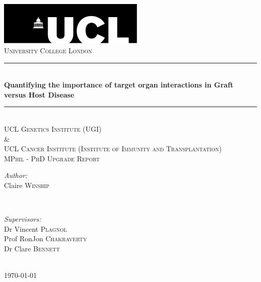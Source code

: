 \documentclass[a4paper,11pt]{report}
\begin{document}
\begin{titlepage}%
\newcommand{\HRule}{\rule{\linewidth}{0.5mm}}

\center 

\includegraphics[width=7cm]{Figures/ucllogo.jpg}\\[1cm]
\textsc{\LARGE University College London}\\[2cm] %
\HRule \\[1cm]
{ \huge \bfseries Quantifying the importance of target organ interactions in Graft versus Host Disease}\\[0.4cm] 
\HRule \\[1.5cm]

\vspace{1cm}
\textsc{\Large UCL Genetics Institute (UGI)}\\[0.5cm] %
\textsc{\Large \&}\\[0.5cm]
\textsc{\Large UCL Cancer Institute (Institute of Immunity and Transplantation) } \\[2.5cm] %

\textsc{\large MPhil - PhD Upgrade Report}\\[1.5cm] %
 
\begin{minipage}[t]{0.8\textwidth}
\raggedright
\emph{Author:}\\
Claire \textsc{Winship} %
\end{minipage}
~
\begin{minipage}[t]{0.8\textwidth}
\raggedleft
\emph{Supervisors:} \\
Dr  Vincent \textsc{Plagnol}\\ 
Prof RonJon \textsc{Chakraverty}\\ 
Dr Clare \textsc{Bennett}\\
\end{minipage}\\[3cm]

{\large \today}\\[3cm] 

\vfill %

\end{titlepage}%
\end{document}
